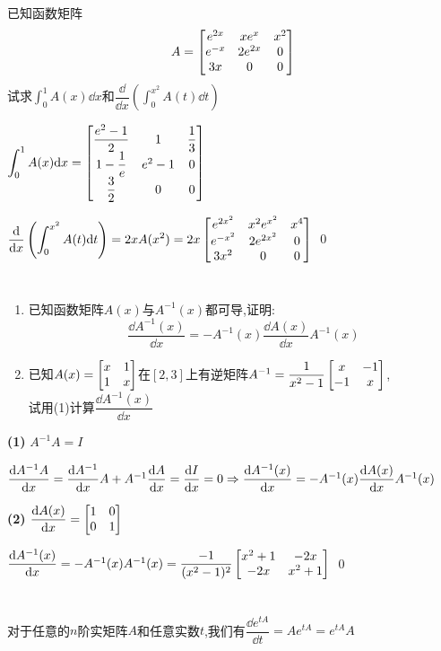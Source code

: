 \documentclass{matrix-homework}
\begin{document}
\newcommand{\ddd}[2]{\dfrac{\dd #1}{\dd #2}}
\newcommand{\ddx}[1]{\ddd{#1}{x}}
\newcommand{\la}{\lambda}


\section{}
已知函数矩阵$$A=\begin{bmatrix}e^{2x} & xe^x & x^2 \\ e^{-x} & 2e^{2x} & 0 \\ 3x & 0 & 0\end{bmatrix}$$试求$\displaystyle\int_{0}^{1}A(x)\dd x$和$\displaystyle\dfrac{\dd}{\dd x}\left(\int_{0}^{x^2}A(t)\dd t\right)$

\answer
$\displaystyle\int_{0}^{1}A(x)\mathrm{d} x=\begin{bmatrix}\dfrac{e^2-1}{2} & 1 & \dfrac{1}{3} \\ 1-\dfrac{1}{e} & e^2-1 & 0 \\ \dfrac{3}{2} & 0 & 0\end{bmatrix}$

$\displaystyle\dfrac{\mathrm{d}}{\mathrm{d} x}\left(\int_{0}^{x^2}A(t)\mathrm{d} t\right)
    = 2xA(x^2) = 2x\begin{bmatrix}e^{2x^2} & x^2e^{x^2} & x^4 \\ e^{-x^2} & 2e^{2x^2} & 0 \\ 3x^2 & 0 & 0\end{bmatrix}$
\qed

\newpage
\section{}
\begin{enumerate}[label=(\arabic*)]
    \item 已知函数矩阵$A(x)$与$A^{-1}(x)$都可导,证明:$$\ddx{A^{-1}(x)}=-A^{-1}(x)\ddx{A(x)}A^{-1}(x)$$
    \item 已知$A(x)=\begin{bmatrix}x & 1 \\ 1 & x\end{bmatrix}$在$[2,3]$上有逆矩阵$A^{-1}=\dfrac{1}{x^2-1}\begin{bmatrix}x & -1 \\ -1 & x\end{bmatrix}$,\\试用(1)计算$\ddx{A^{-1}(x)}$
\end{enumerate}
\answer
\textbf{(1)} $A^{-1}A=I$

$\ddx{A^{-1}A}=\ddx{A^{-1}}A+A^{-1}\ddx{A}=\ddx{I}=0 \\[1em]\Rightarrow \ddx{A^{-1}(x)}=-A^{-1}(x)\ddx{A(x)}A^{-1}(x)$

\textbf{(2)} $\ddx{A(x)}=\mat{1 & 0 \\ 0 & 1}$

$\ddx{A^{-1}(x)}=-A^{-1}(x)A^{-1}(x)=\dfrac{-1}{(x^2-1)^2}\mat{x^2+1 & -2x \\ -2x & x^2+1}$
\qed


\section{}
对于任意的$n$阶实矩阵$A$和任意实数$t$,我们有$\ddd{e^{tA}}{t}=Ae^{tA}=e^{tA}A$
\end{document}
